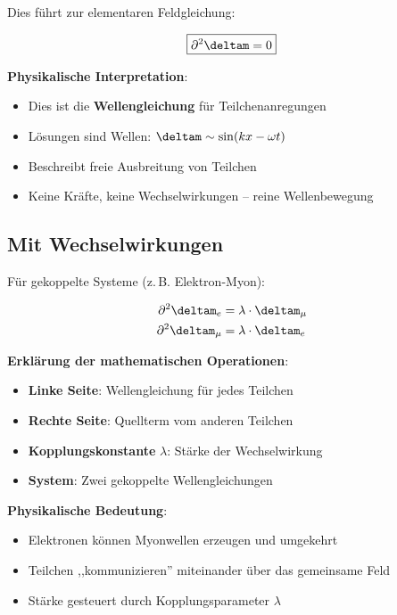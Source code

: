 	Dies führt zur elementaren Feldgleichung:
	
	\begin{equation}
		\boxed{\partial^2 \deltam = 0}
		\label{eq:field_equation}
	\end{equation}
	
	\textbf{Physikalische Interpretation}: 
	\begin{itemize}
		\item Dies ist die \textbf{Wellengleichung} für Teilchenanregungen
		\item Lösungen sind Wellen: $\deltam \sim \sin(kx - \omega t)$
		\item Beschreibt freie Ausbreitung von Teilchen
		\item Keine Kräfte, keine Wechselwirkungen -- reine Wellenbewegung
	\end{itemize}
	
	\subsection{Mit Wechselwirkungen}
	
	Für gekoppelte Systeme (z.\,B. Elektron-Myon):
	
	\begin{align}
		\partial^2 \deltam_e &= \lambda \cdot \deltam_{\mu} \\
		\partial^2 \deltam_{\mu} &= \lambda \cdot \deltam_e
	\end{align}
	
	\textbf{Erklärung der mathematischen Operationen}:
	\begin{itemize}
		\item \textbf{Linke Seite}: Wellengleichung für jedes Teilchen
		\item \textbf{Rechte Seite}: Quellterm vom anderen Teilchen
		\item \textbf{Kopplungskonstante} $\lambda$: Stärke der Wechselwirkung
		\item \textbf{System}: Zwei gekoppelte Wellengleichungen
	\end{itemize}
	
	\textbf{Physikalische Bedeutung}:
	\begin{itemize}
		\item Elektronen können Myonwellen erzeugen und umgekehrt
		\item Teilchen ,,kommunizieren'' miteinander über das gemeinsame Feld
		\item Stärke gesteuert durch Kopplungsparameter $\lambda$
	\end{itemize}

